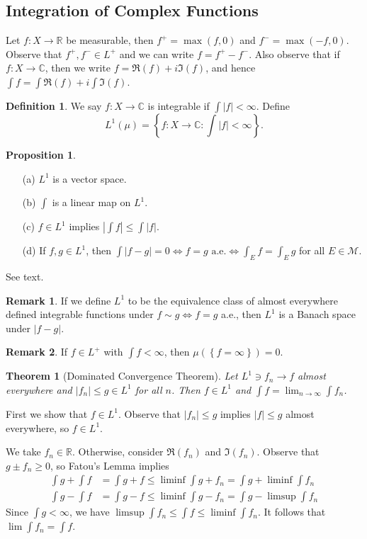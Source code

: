 \documentclass[11pt]{article}
\newtheorem{thm}{Theorem}[section]
\theoremstyle{definition}
\newtheorem{defn}{Definition}[section]
\newtheorem{prop}{Proposition}[section]
\newtheorem{remark}{Remark}[section]
\newcommand{\set}[1]{\left\{ #1 \right\}}
\newcommand{\abs}[1]{\left\lvert#1\right\rvert} %
\newcommand{\RR}{\mathbb{R}}
\newcommand{\CC}{\mathbb{C}}
\newcommand{\m}[1]{\mathcal{#1}}
\begin{document}
\subsection{Integration of Complex Functions}

Let $f:X\to\RR$ be measurable, then $f^+=\max(f,0)$ and $f^-=\max(-f,0)$. Observe that
$f^+,f^-\in L^+$ and we can write $f=f^+-f^-$. Also observe that if $f:X\to\CC$, then we
write $f=\Re(f)+i\Im(f)$, and hence $\int f = \int\Re(f)+i\int\Im(f)$.

\begin{defn}
  We say $f:X\to\CC$ is integrable if $\int\abs{f}<\infty$. Define
  \[
    L^1(\mu)=\set{f:X\to\CC:\int\abs{f}<\infty} .
  \]
\end{defn}

\begin{prop}
  \begin{enumerate}
    \item[(a)] $L^1$ is a vector space.
    \item[(b)] $\int$ is a linear map on $L^1$. 
    \item[(c)] $f\in L^1$ implies $\abs{\int f}\le\int\abs{f}$. 
    \item[(d)] If $f,g\in L^1$, then $\int\abs{f-g}=0\iff f=g\text{ a.e.}\iff
    \int_Ef=\int_Eg$ for all $E\in\m{M}$. 
  \end{enumerate}
\end{prop}
\proof See text.  \qedhere

\begin{remark}
  If we define $L^1$ to be the equivalence class of almost everywhere defined integrable
  functions under $f\sim g \iff f=g$ a.e., then $L^1$ is a Banach space under $\abs{f-g}$. 
\end{remark}

\begin{remark}
  If $f\in L^+$ with $\int f<\infty$, then $\mu(\set{f=\infty})=0$. 
\end{remark}
 \qedhere

\begin{thm}[Dominated Convergence Theorem]
  Let $L^1\ni f_n\to f$ almost everywhere and $\abs{f_n}\le g\in L^1$ for all $n$. Then
  $f\in L^1$ and $\int f = \lim_{n\to\infty}\int f_n$. 
\end{thm}
\proof
First we show that $f\in L^1$. Observe that $\abs{f_n}\le g$ implies $\abs{f}\le g$ almost
everywhere, so $f\in L^1$. 

We take $f_n\in\RR$. Otherwise, consider $\Re(f_n)$ and $\Im(f_n)$. Observe that $g\pm
f_n\ge 0$, so Fatou's Lemma implies
\begin{align*}
  \int g + \int f &= \int g+f \le \liminf\int g+f_n = \int g + \liminf\int f_n \\
  \int g - \int f &= \int g-f \le \liminf\int g-f_n = \int g - \limsup\int f_n
\end{align*}
Since $\int g<\infty$, we have $\limsup\int f_n\le \int f \le \liminf\int f_n$. It follows
that $\lim\int f_n = \int f$. 
\qedhere
\end{document}
